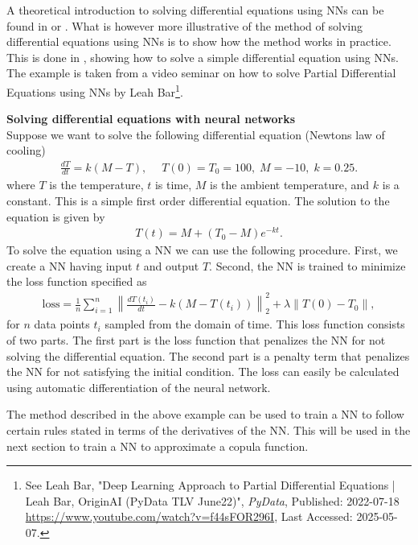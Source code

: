 A theoretical introduction to solving differential equations using \gls{NN}s can be found in  or . What is however more illustrative of the method of solving differential equations using \gls{NN}s is to show how the method works in practice. This is done in , showing how to solve a simple differential equation using \gls{NN}s. The example is taken from a video seminar on how to solve Partial Differential Equations using \gls{NN}s by Leah Bar\footnote{See Leah Bar, "Deep Learning Approach to Partial Differential Equations | Leah Bar, OriginAI (PyData TLV June22)", \textit{PyData}, Published: 2022-07-18 \url{https://www.youtube.com/watch?v=f44sFOR296I}, Last Accessed: 2025-05-07.}. 

\begin{example}\label{ex:NeuralNetworkDifferentialEquation}
    \textbf{Solving differential equations with neural networks}\\
    Suppose we want to solve the following differential equation (Newtons law of cooling)
    \begin{align*}
        \frac{dT}{dt} = k(M-T), \quad \; T(0) = T_0 = 100,\; M = -10,\; k = 0.25.
    \end{align*}
    where $T$ is the temperature, $t$ is time, $M$ is the ambient temperature, and $k$ is a constant. This is a simple first order differential equation. The solution to the equation is given by
    \begin{align*}
        T(t) = M + (T_0-M)e^{-kt}.
    \end{align*}
    To solve the equation using a \gls{NN} we can use the following procedure. First, we create a \gls{NN} having input $t$ and output $T$. Second, the \gls{NN} is trained to minimize the loss function specified as 
    \begin{align*}
        \mathrm{loss} = \frac{1}{n} \sum_{i=1}^{n} \left\| \frac{dT(t_i)}{dt} - k(M-T(t_i))\right\|_2^2 + \lambda \left\|T(0) - T_0\right\|,
    \end{align*}
    for $n$ data points $t_i$ sampled from the domain of time. 
    This loss function consists of two parts. The first part is the loss function that penalizes the \gls{NN} for not solving the differential equation. The second part is a penalty term that penalizes the \gls{NN} for not satisfying the initial condition. The loss can easily be calculated using automatic differentiation of the neural network. 
\end{example}
The method described in the above example can be used to train a \gls{NN} to follow certain rules stated in terms of the derivatives of the \gls{NN}. This will be used in the next section to train a \gls{NN} to approximate a copula function.  


